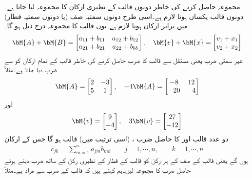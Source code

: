 مجموعہ حاصل کرنے کی خاطر دونوں قالب کے نظیری ارکان کا مجموعہ لیا جاتا ہے۔دونوں قالب یکساں  ہونا لازم ہے۔اسی طرح دونوں سمتیہ صف (یا دونوں سمتیہ قطار) میں برابر ارکان ہونا لازم ہے۔یوں  قالب کا مجموعہ درج ذیل ہو گا۔
\begin{align}
\bM{A}+\bM{B}=
\begin{bmatrix}
a_{11}+b_{11} & a_{12}+b_{12}\\
a_{21}+b_{21}& a_{22}+b_{bb}
\end{bmatrix}, \quad \bM{v}+\bM{x}=
\begin{bmatrix}
v_1+x_1\\
v_2+x_2
\end{bmatrix}
\end{align} 
 غیر سمتی ضرب یعنی مستقل   سے قالب کا ضرب حاصل کرنے کی خاطر قالب کے تمام ارکان کو  سے ضرب دیا جاتا ہے۔مثلاً 
\begin{align*}
\bM{A}=
\begin{bmatrix}
2& -3\\
5&1
\end{bmatrix}, \quad 
-4\bM{A}=
\begin{bmatrix}
-8&12\\
-20&-4
\end{bmatrix}
\end{align*}
اور
\begin{align*}
\bM{v}=
\begin{bmatrix}
9\\
-4
\end{bmatrix}, \quad 
3\bM{v}=
\begin{bmatrix}
27\\
-12
\end{bmatrix}
\end{align*}
دو عدد  قالب  اور   کا حاصل ضرب ، (اسی ترتیب میں)  قالب  ہو گا جس کے ارکان 
\begin{align}
c_{jk}=\sum_{m=1}^{n} a_{jm} b_{mk} \quad \quad j=1, \cdots, n, \quad\quad k=1,\cdots,n
\end{align}
ہوں گے یعنی  قالب کے  صف کے ہر رکن کو  قالب کے  قطار کے نظیری رکن کے ساتھ ضرب دیتے ہوئے  حاصل ضرب  کا مجموعہ لیں۔ہم کہتے ہیں کہ قالب کے ضرب سے مراد   ہے۔مثلاً
